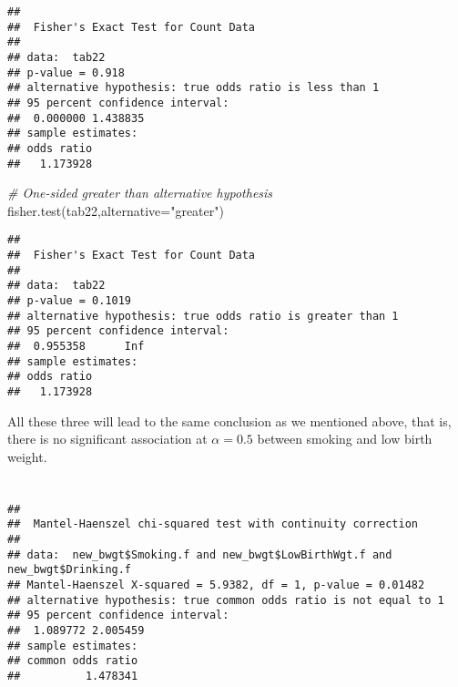 \documentclass[
]{article}
\newenvironment{Shaded}{\begin{snugshade}}{\end{snugshade}}
\newcommand{\AttributeTok}[1]{\textcolor[rgb]{0.77,0.63,0.00}{#1}}
\newcommand{\CommentTok}[1]{\textcolor[rgb]{0.56,0.35,0.01}{\textit{#1}}}
\newcommand{\FunctionTok}[1]{\textcolor[rgb]{0.00,0.00,0.00}{#1}}
\newcommand{\NormalTok}[1]{#1}
\newcommand{\SpecialCharTok}[1]{\textcolor[rgb]{0.00,0.00,0.00}{#1}}
\newcommand{\StringTok}[1]{\textcolor[rgb]{0.31,0.60,0.02}{#1}}
\begin{document}
\begin{verbatim}
## 
##  Fisher's Exact Test for Count Data
## 
## data:  tab22
## p-value = 0.918
## alternative hypothesis: true odds ratio is less than 1
## 95 percent confidence interval:
##  0.000000 1.438835
## sample estimates:
## odds ratio 
##   1.173928
\end{verbatim}

\begin{Shaded}
\begin{Highlighting}[]
\CommentTok{\# One{-}sided greater than alternative hypothesis}
\FunctionTok{fisher.test}\NormalTok{(tab22,}\AttributeTok{alternative=}\StringTok{"greater"}\NormalTok{)}
\end{Highlighting}
\end{Shaded}

\begin{verbatim}
## 
##  Fisher's Exact Test for Count Data
## 
## data:  tab22
## p-value = 0.1019
## alternative hypothesis: true odds ratio is greater than 1
## 95 percent confidence interval:
##  0.955358      Inf
## sample estimates:
## odds ratio 
##   1.173928
\end{verbatim}

All these three will lead to the same conclusion as we mentioned above,
that is, there is no significant association at \(\alpha=0.5\) between
smoking and low birth weight.

\hypertarget{section}{%
\section{}\label{section}}

\begin{Shaded}
\end{Shaded}

\begin{verbatim}
## 
##  Mantel-Haenszel chi-squared test with continuity correction
## 
## data:  new_bwgt$Smoking.f and new_bwgt$LowBirthWgt.f and new_bwgt$Drinking.f
## Mantel-Haenszel X-squared = 5.9382, df = 1, p-value = 0.01482
## alternative hypothesis: true common odds ratio is not equal to 1
## 95 percent confidence interval:
##  1.089772 2.005459
## sample estimates:
## common odds ratio 
##          1.478341
\end{verbatim}
\end{document}
